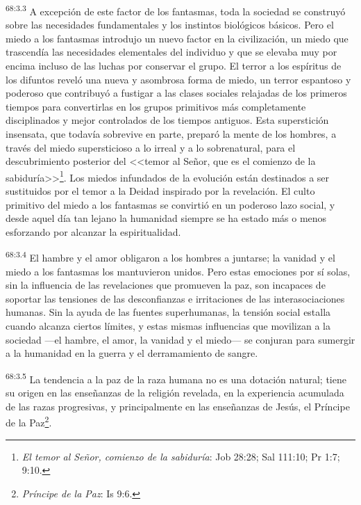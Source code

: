 \par
\textsuperscript{68:3.3} A excepción de este factor de los fantasmas, toda la sociedad se construyó sobre las necesidades fundamentales y los instintos biológicos básicos. Pero el miedo a los fantasmas introdujo un nuevo factor en la civilización, un miedo que trascendía las necesidades elementales del individuo y que se elevaba muy por encima incluso de las luchas por conservar el grupo. El terror a los espíritus de los difuntos reveló una nueva y asombrosa forma de miedo, un terror espantoso y poderoso que contribuyó a fustigar a las clases sociales relajadas de los primeros tiempos para convertirlas en los grupos primitivos más completamente disciplinados y mejor controlados de los tiempos antiguos. Esta superstición insensata, que todavía sobrevive en parte, preparó la mente de los hombres, a través del miedo supersticioso a lo irreal y a lo sobrenatural, para el descubrimiento posterior del <<temor al Señor, que es el comienzo de la sabiduría>>\footnote{\textit{El temor al Señor, comienzo de la sabiduría}: Job 28:28; Sal 111:10; Pr 1:7; 9:10.}. Los miedos infundados de la evolución están destinados a ser sustituidos por el temor a la Deidad inspirado por la revelación. El culto primitivo del miedo a los fantasmas se convirtió en un poderoso lazo social, y desde aquel día tan lejano la humanidad siempre se ha estado más o menos esforzando por alcanzar la espiritualidad.

\par
\textsuperscript{68:3.4} El hambre y el amor obligaron a los hombres a juntarse; la vanidad y el miedo a los fantasmas los mantuvieron unidos. Pero estas emociones por sí solas, sin la influencia de las revelaciones que promueven la paz, son incapaces de soportar las tensiones de las desconfianzas e irritaciones de las interasociaciones humanas. Sin la ayuda de las fuentes superhumanas, la tensión social estalla cuando alcanza ciertos límites, y estas mismas influencias que movilizan a la sociedad ---el hambre, el amor, la vanidad y el miedo--- se conjuran para sumergir a la humanidad en la guerra y el derramamiento de sangre.

\par
\textsuperscript{68:3.5} La tendencia a la paz de la raza humana no es una dotación natural; tiene su origen en las enseñanzas de la religión revelada, en la experiencia acumulada de las razas progresivas, y principalmente en las enseñanzas de Jesús, el Príncipe de la Paz\footnote{\textit{Príncipe de la Paz}: Is 9:6.}.

